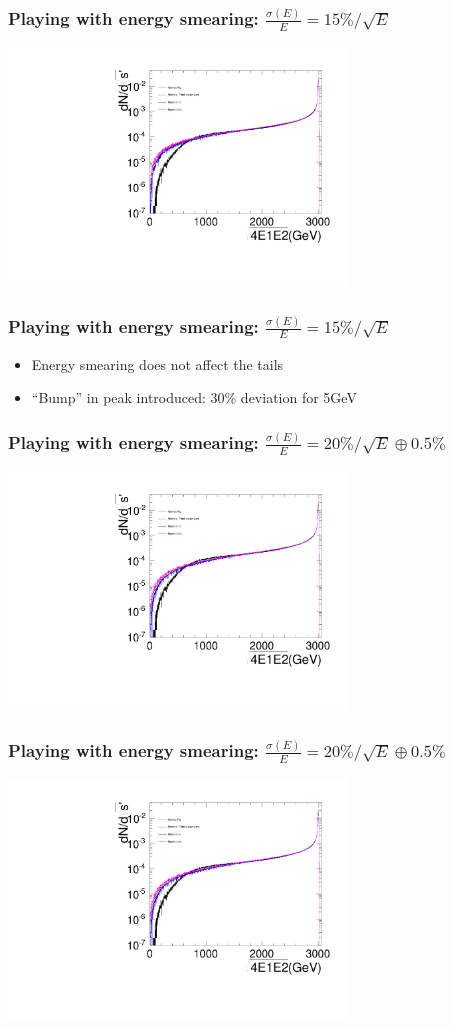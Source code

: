 \documentclass{beamer}
\begin{document}
\begin{frame}
\frametitle{Playing with energy smearing: $\frac{\sigma(E)}{E}=15\%/\sqrt{E}$}
\centering
\includegraphics[width=9cm,page=3]{./Spectra_BHWide_Esmeared15.pdf}
\end{frame}
\begin{frame}
\frametitle{Playing with energy smearing: $\frac{\sigma(E)}{E}=15\%/\sqrt{E}$}
\begin{itemize}
  \item Energy smearing does not affect the tails
  \item ``Bump'' in peak introduced: 30\% deviation for 5GeV
\end{itemize} 
\end{frame}
\begin{frame}
\frametitle{Playing with energy smearing:
$\frac{\sigma(E)}{E}=20\%/\sqrt{E}\oplus0.5\%$}
\centering
\includegraphics[width=9cm,page=1]{Spectra_BHWide_Esmeared20005.pdf}
\end{frame}
\begin{frame}
\frametitle{Playing with energy smearing:
$\frac{\sigma(E)}{E}=20\%/\sqrt{E}\oplus0.5\%$}
\centering
\includegraphics[width=9cm,page=2]{Spectra_BHWide_Esmeared20005.pdf}
\end{frame}
\end{document}
